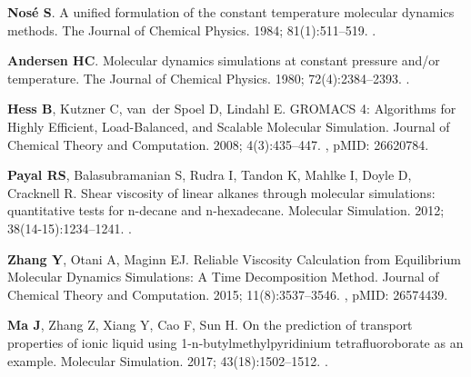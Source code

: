 \documentclass[9pt,bestpractices]{livecoms}
\begin{document}
\begin{thebibliography}{59}
\textbf{\color{LiveCoMSMediumGrey} Nos{\'e} S}.
\newblock A unified formulation of the constant temperature molecular dynamics
  methods.
\newblock The Journal of Chemical Physics.  1984; 81(1):511--519.
\newblock \href{https://dx.doi.org/10.1063/1.447334}{\doiprefix
  }.

\textbf{\color{LiveCoMSMediumGrey} Andersen HC}.
\newblock Molecular dynamics simulations at constant pressure and/or
  temperature.
\newblock The Journal of Chemical Physics.  1980; 72(4):2384--2393.
\newblock \href{https://dx.doi.org/10.1063/1.439486}{\doiprefix
  }.

\textbf{\color{LiveCoMSMediumGrey} Hess B}, Kutzner C, van~der Spoel D, Lindahl
  E.
\newblock GROMACS 4{:} Algorithms for Highly Efficient, Load-Balanced, and
  Scalable Molecular Simulation.
\newblock Journal of Chemical Theory and Computation.  2008; 4(3):435--447.
\newblock \href{https://dx.doi.org/10.1021/ct700301q}{\doiprefix
  }, pMID: 26620784.

\textbf{\color{LiveCoMSMediumGrey} Payal RS}, Balasubramanian S, Rudra I,
  Tandon K, Mahlke I, Doyle D, Cracknell R.
\newblock Shear viscosity of linear alkanes through molecular simulations:
  quantitative tests for n-decane and n-hexadecane.
\newblock Molecular Simulation.  2012; 38(14-15):1234--1241.
\newblock \href{https://dx.doi.org/10.1080/08927022.2012.702423}{\doiprefix
  }.

\textbf{\color{LiveCoMSMediumGrey} Zhang Y}, Otani A, Maginn EJ.
\newblock Reliable Viscosity Calculation from Equilibrium Molecular Dynamics
  Simulations: A Time Decomposition Method.
\newblock Journal of Chemical Theory and Computation.  2015; 11(8):3537--3546.
\newblock \href{https://dx.doi.org/10.1021/acs.jctc.5b00351}{\doiprefix
  }, pMID: 26574439.

\textbf{\color{LiveCoMSMediumGrey} Ma J}, Zhang Z, Xiang Y, Cao F, Sun H.
\newblock On the prediction of transport properties of ionic liquid using
  1-n-butylmethylpyridinium tetrafluoroborate as an example.
\newblock Molecular Simulation.  2017; 43(18):1502--1512.
\newblock \href{https://dx.doi.org/10.1080/08927022.2017.1321760}{\doiprefix
  }.


\end{thebibliography}
\end{document}
